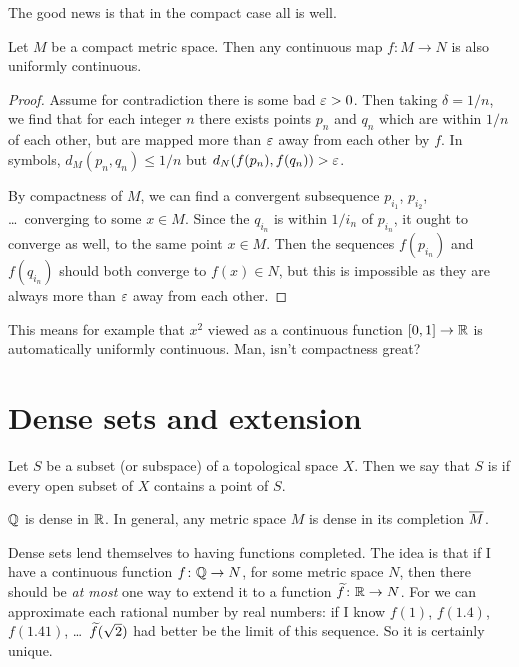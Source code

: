 The good news is that in the compact case all is well.
\begin{theorem}
	Let $M$ be a compact metric space.
	Then any continuous map $f \colon M \to N$ is also uniformly continuous.
\end{theorem}
\begin{proof}
	Assume for contradiction there is some bad $\varepsilon > 0$.
	Then taking $\delta = 1/n$, we find that for each integer $n$
	there exists points $p_n$ and $q_n$ which are within $1/n$ of each other,
	but are mapped more than $\varepsilon$ away from each other by $f$.
	In symbols, $d_M(p_n, q_n) \le 1/n$ but $d_N(f(p_n), f(q_n)) > \varepsilon$.

	By compactness of $M$,
	we can find a convergent subsequence
	$p_{i_1}$, $p_{i_2}$, \dots\ converging to some $x \in M$.
	Since the $q_{i_n}$ is within $1/i_n$ of $p_{i_n}$,
	it ought to converge as well, to the same point $x \in M$.
	Then the sequences $f(p_{i_n})$ and $f(q_{i_n})$
	should both converge to $f(x) \in N$,
	but this is impossible as they are always more than $\varepsilon$
	away from  each other.
\end{proof}
This means for example that $x^2$ viewed
as a continuous function $[0,1] \to \mathbb R$ is automatically
uniformly continuous.
Man, isn't compactness great?

\section{Dense sets and extension}

\begin{definition}
	Let $S$ be a subset (or subspace) of a topological space $X$.
	Then we say that $S$ is 
	if every open subset of $X$ contains a point of $S$.
\end{definition}

\begin{example}
	\listhack
	\begin{enumerate}[(a)]
		\ii $\mathbb Q$ is dense in $\mathbb R$.
		\ii In general, any metric space $M$ is dense
		in its completion $\overline M$.
	\end{enumerate}
\end{example}

Dense sets lend themselves to having functions completed.
The idea is that if I have a continuous function
$f \colon \mathbb Q \to N$, for some metric space $N$,
then there should be \emph{at most} one way to extend it to a function
$\widetilde f \colon \mathbb R \to N$.
For we can approximate each rational number by real numbers:
if I know $f(1)$, $f(1.4)$, $f(1.41)$, \dots\
$\widetilde f(\sqrt2)$ had better be the limit of this sequence.
So it is certainly unique.


